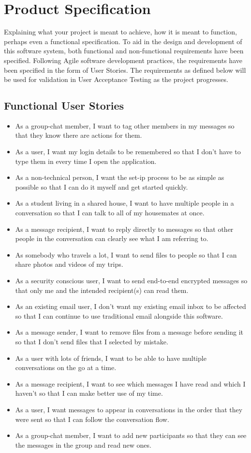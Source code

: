 \chapter{Product Specification}

Explaining what your project is meant to achieve, how it is meant to function, perhaps even a functional specification.
To aid in the design and development of this software system, both functional and non-functional requirements have been specified. Following Agile software development practices, the requirements have been specified in the form of User Stories. The requirements as defined below will be used for validation in User Acceptance Testing as the project progresses.

\section{Functional User Stories}
\begin{itemize}
  \item As a group-chat member, I want to tag other members in my messages so that they know there are actions for them.
  \item As a user, I want my login details to be remembered so that I don't have to type them in every time I open the application.
  \item As a non-technical person, I want the set-ip process to be as simple as possible so that I can do it myself and get started quickly.
  \item As a student living in a shared house, I want to have multiple people in a conversation so that I can talk to all of my housemates at once.
  \item As a message recipient, I want to reply directly to messages so that other people in the conversation can clearly see what I am referring to.
  \item As somebody who travels a lot, I want to send files to people so that I can share photos and videos of my trips.
  \item As a security conscious user, I want to send end-to-end encrypted messages so that only me and the intended recipient(s) can read them.
  \item As an existing email user, I don't want my existing email inbox to be affected so that I can continue to use traditional email alongside this software.
  \item As a message sender, I want to remove files from a message before sending it so that I don't send files that I selected by mistake.
  \item As a user with lots of friends, I want to be able to have multiple conversations on the go at a time.
  \item As a message recipient, I want to see which messages I have read and which I haven't so that I can make better use of my time.
  \item As a user, I want messages to appear in conversations in the order that they were sent so that I can follow the conversation flow.
  \item As a group-chat member, I want to add new participants so that they can see the messages in the group and read new ones.
\end{itemize}